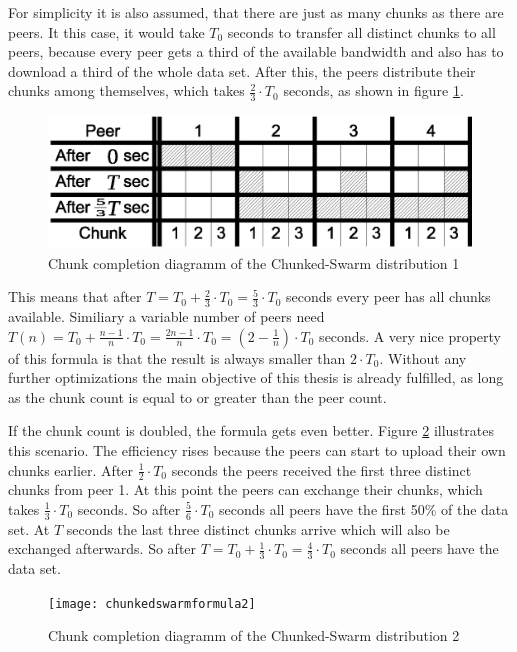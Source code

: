 For simplicity it is also assumed, that there are just as many chunks as there are peers. It this case, it would take $T_0$ seconds to transfer all distinct chunks to all peers, because every peer gets a third of the available bandwidth and also has to download a third of the whole data set. After this, the peers distribute their chunks among themselves, which takes $\frac{2}{3} \cdot T_0$ seconds, as shown in figure \ref{fig:chunkedswarmformula1}.

\begin{figure}[H]
\centering
\includegraphics[width=12cm]{chunkedswarmformula1}
\caption{Chunk completion diagramm of the Chunked-Swarm distribution 1}
\label{fig:chunkedswarmformula1}
\end{figure}

This means that after $T = T_0 + \frac{2}{3} \cdot T_0 = \frac{5}{3} \cdot T_0$ seconds every peer has all chunks available. Similiary a variable number of peers need $T(n) = T_0 + \frac{n - 1}{n} \cdot T_0 = \frac{2n - 1}{n} \cdot T_0 = (2 - \frac{1}{n}) \cdot T_0$ seconds. A very nice property of this formula is that the result is always smaller than $2 \cdot T_0$. Without any further optimizations the main objective of this thesis is already fulfilled, as long as the chunk count is equal to or greater than the peer count.

If the chunk count is doubled, the formula gets even better. Figure \ref{fig:chunkedswarmformula2} illustrates this scenario. The efficiency rises because the peers can start to upload their own chunks earlier. After $\frac{1}{2} \cdot T_0$ seconds the peers received the first three distinct chunks from peer 1. At this point the peers can exchange their chunks, which takes $\frac{1}{3} \cdot T_0$ seconds. So after $\frac{5}{6} \cdot T_0$ seconds all peers have the first 50\% of the data set. At $T$ seconds the last three distinct chunks arrive which will also be exchanged afterwards. So after $T = T_0 + \frac{1}{3} \cdot T_0 = \frac{4}{3} \cdot T_0$ seconds all peers have the data set.

\begin{figure}[H]
\centering
\texttt{[image: chunkedswarmformula2]}
\caption{Chunk completion diagramm of the Chunked-Swarm distribution 2}
\label{fig:chunkedswarmformula2}
\end{figure}
